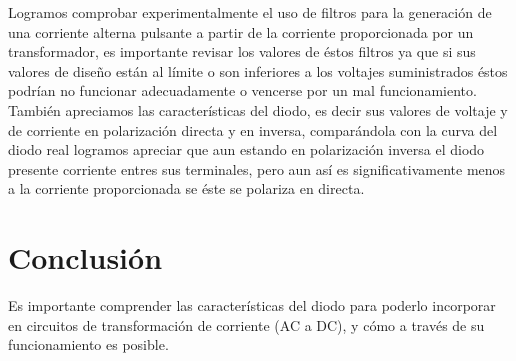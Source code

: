 \documentclass{article}
\begin{document}
Logramos comprobar experimentalmente el uso de filtros para la generación de una corriente alterna pulsante a partir de la corriente proporcionada por un transformador, es importante revisar los valores de éstos filtros ya que si sus valores de diseño están al límite o son inferiores a los voltajes suministrados éstos podrían no funcionar adecuadamente o vencerse por un mal funcionamiento.\\

También apreciamos las características del diodo, es decir sus valores de voltaje y de corriente en polarización directa y en inversa, comparándola con la curva del diodo real logramos apreciar que aun estando en polarización inversa el diodo presente corriente entres sus terminales, pero aun así es significativamente menos a la corriente proporcionada se éste se polariza en directa. \\

\section{Conclusión}

Es importante comprender las características del diodo para poderlo incorporar en circuitos de transformación de corriente (AC a DC), y cómo a través de su funcionamiento es posible. \\







\end{document}
